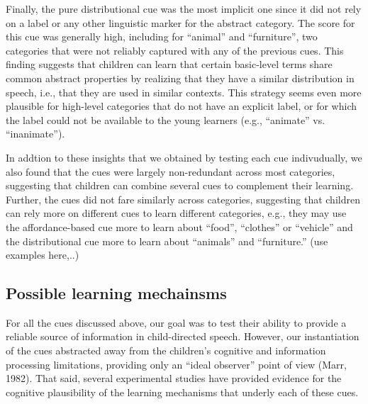 \documentclass[english,,man]{apa6}
\begin{document}
Finally, the pure distributional cue was the most implicit one since it did not rely on a label or any other linguistic marker for the abstract category. The score for this cue was generally high, including for \enquote{animal} and \enquote{furniture}, two categories that were not reliably captured with any of the previous cues. This finding suggests that children can learn that certain basic-level terms share common abstract properties by realizing that they have a similar distribution in speech, i.e., that they are used in similar contexts. This strategy seems even more plausible for high-level categories that do not have an explicit label, or for which the label could not be available to the young learners (e.g., \enquote{animate} vs. \enquote{inanimate}).

In addtion to these insights that we obtained by testing each cue indivudually, we also found that the cues were largely non-redundant across most categories, suggesting that children can combine several cues to complement their learning. Further, the cues did not fare similarly across categories, suggesting that children can rely more on different cues to learn different categories, e.g., they may use the affordance-based cue more to learn about \enquote{food}, \enquote{clothes} or \enquote{vehicle} and the distributional cue more to learn about \enquote{animals} and \enquote{furniture.} (use examples here,..)

\hypertarget{possible-learning-mechainsms}{%
\subsection{Possible learning mechainsms}\label{possible-learning-mechainsms}}

For all the cues discussed above, our goal was to test their ability to provide a reliable source of information in child-directed speech. However, our instantiation of the cues abstracted away from the children's cognitive and information processing limitations, providing only an \enquote{ideal observer} point of view (Marr, 1982). That said, several experimental studies have provided evidence for the cognitive plausibility of the learning mechanisms that underly each of these cues.
\end{document}
